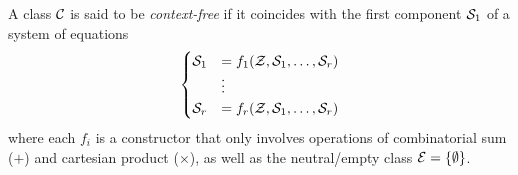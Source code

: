\message{ !name(thesis.tex)}\documentclass[12pt, a4paper, twoside]{report}
\begin{document}
\begin{definition}
  A class $\C$ is said to be \emph{context-free} if it coincides with the first component $\S_1$ of a system of equations
  \begin{align}
  \begin{aligned}
    \begin{cases}
      \S_1 &= f_1(\Z,\S_1,\ldots,\S_r)\\
      &\vdots\\
      \S_r &= f_r(\Z,\S_1,\ldots,\S_r)
    \end{cases}
  \end{aligned}
  \end{align}
  where each $f_i$ is a constructor that only involves operations of combinatorial sum ($+$) and cartesian product ($\times$), as well as the neutral/empty class $\EE = \{\emptyset\}$.
\end{definition}
\end{document}
